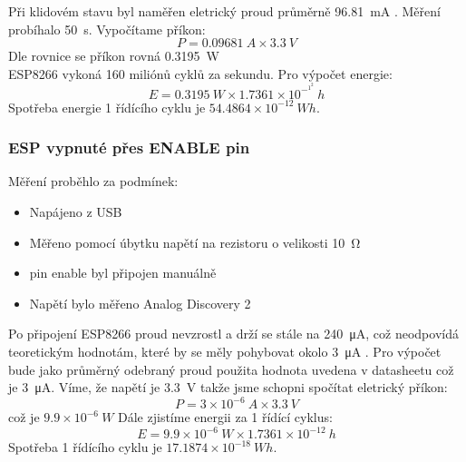 \documentclass[a4paper, 12pt]{report}
\begin{document}
		 			Při klidovém stavu byl naměřen eletrický proud průměrně \SI{96.81}{mA} . Měření probíhalo \SI{50}{s}. Vypočítame příkon:
						$$P = \SI{0.09681}{A} \times \SI{3.3}{V}$$
		 			Dle rovnice se příkon rovná \SI{0.3195}{W} \\
		 			ESP8266 vykoná 160 miliónů cyklů za sekundu. Pro výpočet energie:
		 				$$E = \SI{0.3195}{W} \times 1.7361 \times 10 ^-^1^2 \SI{}{h}$$
					Spotřeba energie 1 řídícího cyklu je $ 54.4864 \times 10^{-12}\SI{}{Wh}$.


				\subsubsection{ESP vypnuté přes ENABLE pin}
					Měření proběhlo za podmínek:
					\begin{itemize}
						\item Napájeno z USB
						\item Měřeno pomocí úbytku napětí na rezistoru o velikosti \SI{10}{\ohm}
						\item pin enable byl připojen manuálně
						\item Napětí bylo měřeno Analog Discovery 2
					\end{itemize}
					Po připojení ESP8266 proud nevzrostl a drží se stále na \SI{240}{\micro A}, což neodpovídá teoretickým hodnotám, které by se měly pohybovat okolo \SI{3}{\micro A}
					.
					Pro výpočet bude jako průměrný odebraný proud použita hodnota uvedena v datasheetu což je \SI{3}{\micro A}. Víme, že napětí je \SI{3.3}{V} takže jsme schopni spočítat eletrický příkon:
				 		$$P = 3\times 10^{-6} \SI{}{A}\times \SI{3.3}{V}$$
					což je $9.9 \times 10^{-6} \SI{}{W}$ Dále zjistíme energii za 1 řídící cyklus:
					 $$E = 9.9 \times 10^{-6} \SI{}{W} \times 1.7361 \times 10 ^{-12} \SI{}{h}$$
					Spotřeba 1 řídícího cyklu je $17.1874 \times 10^{-18} \SI{}{Wh}$.
\end{document}
